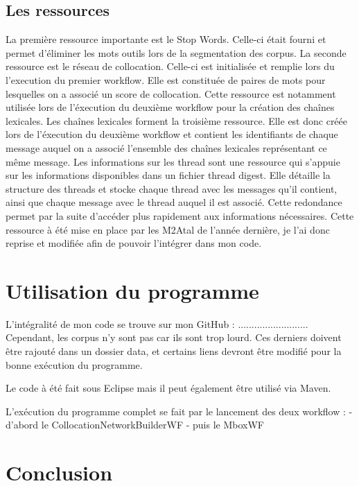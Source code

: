 \documentclass[a4paper]{article}
\begin{document}
	\subsection{Les ressources}
	La première ressource importante est le Stop Words. Celle-ci était fourni et permet d'éliminer les mots outils lors de la segmentation des corpus. 
La seconde ressource est le réseau de collocation. Celle-ci est initialisée et remplie lors du l'execution du premier workflow. Elle est constituée de paires de mots pour lesquelles on a associé un score de collocation. Cette ressource est notamment utilisée lors de l'éxecution du deuxième workflow pour la création des chaînes lexicales. 
Les chaînes lexicales forment la troisième ressource. Elle est donc créée lors de l'éxecution du deuxième workflow et contient les identifiants de chaque message auquel on a associé l'ensemble des chaînes lexicales représentant ce même message. 
Les informations sur les thread sont une ressource qui s’appuie sur les informations disponibles dans un fichier thread digest. Elle détaille la structure des threads et stocke chaque thread avec les messages qu’il contient, ainsi que chaque message avec le thread auquel il est associé. Cette redondance permet par la suite d’accéder plus rapidement aux informations nécessaires. Cette ressource à été mise en place par les M2Atal de l'année dernière, je l'ai donc reprise et modifiée afin de pouvoir l'intégrer dans mon code.
	
	
	\section{Utilisation du programme}

	L'intégralité de mon code se trouve sur mon GitHub :
..........................
Cependant, les corpus n'y sont pas car ils sont trop lourd. Ces derniers doivent être rajouté dans un dossier data, et certains liens devront être modifié pour la bonne exécution du programme. 

Le code à été fait sous Eclipse mais il peut également être utilisé via Maven. 

L'exécution du programme complet se fait par le lancement des deux workflow :
- d'abord le CollocationNetworkBuilderWF
- puis le MboxWF


	\section*{Conclusion}
\end{document}
